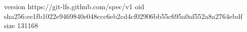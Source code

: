 version https://git-lfs.github.com/spec/v1
oid sha256:ee1fb1022e9469840e048ccc6eb2cd4cf02906bb55c695a0af552a8a2764ebdf
size 131168
